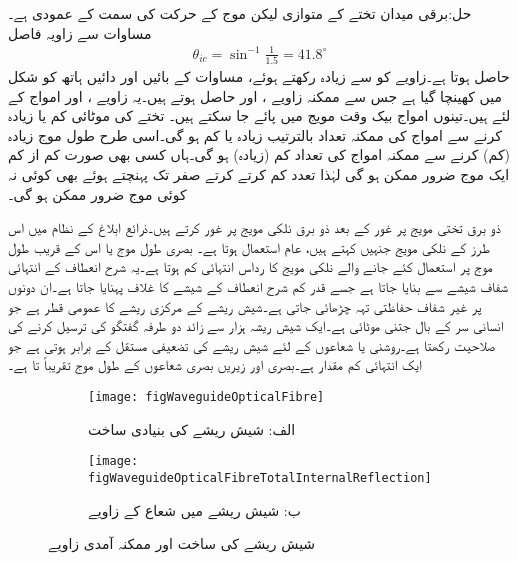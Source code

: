 حل:برقی میدان تختے کے متوازی لیکن موج کے حرکت کی سمت کے عمودی ہے۔مساوات  سے زاویہ فاصل
\begin{align}
\theta_{ic}=\sin^{-1} \frac{1}{1.5}=41.8^{\circ}
\end{align}
حاصل ہوتا ہے۔زاویے کو  سے زیادہ رکھتے  ہوئے، مساوات   کے  بائیں اور دائیں ہاتھ کو شکل  میں کھینچا گیا ہے جس سے ممکنہ زاویے ،  اور  حاصل ہوتے  ہیں۔یہ زاویے ،  اور  امواج کے لئے ہیں۔تینوں امواج بیک وقت مویج میں پائے جا سکتے ہیں۔ تختے کی موٹائی کم یا زیادہ کرنے سے امواج کی ممکنہ تعداد بالترتیب زیادہ یا کم ہو گی۔اسی طرح طول موج زیادہ (کم) کرنے سے ممکنہ امواج کی تعداد کم (زیادہ) ہو گی۔ہاں کسی بھی صورت کم از کم ایک موج ضرور ممکن ہو گی لہٰذا تعدد کم کرتے کرتے صفر تک پہنچتے ہوئے بھی کوئی نہ کوئی موج ضرور ممکن ہو گی۔

ذو برق تختی مویج پر غور کے بعد ذو برق نلکی مویج پر غور کرتے ہیں۔ذرائع ابلاغ کے نظام  میں اس طرز کے نلکی مویج جنہیں  کہتے ہیں،  عام استعمال ہوتا ہے۔ بصری طول موج  یا اس کے قریب طول موج پر استعمال کئے جانے والے نلکی مویج کا رداس انتہائی کم ہوتا ہے۔یہ  شرح  انعطاف کے انتہائی شفاف شیشے سے بنایا جاتا ہے جسے قدر کم  شرح  انعطاف  کے شیشے کا غلاف پہنایا جاتا ہے۔ان دونوں پر غیر شفاف حفاظتی تہہ چڑھائی جاتی ہے۔شیش ریشے کے مرکزی ریشے کا عمومی قطر  ہے جو انسانی سر کے بال جتنی موٹائی ہے۔ایک شیش ریشہ ہزار سے زائد دو طرفہ گفتگو کی ترسیل کرنے کی صلاحیت رکھتا ہے۔روشنی یا  شعاعوں کے لئے شیش ریشے کی تضعیفی مستقل   کے برابر ہوتی ہے جو ایک انتہائی کم مقدار ہے۔بصری اور زیریں بصری شعاعوں کے طول موج تقریباً  تا  ہے۔

\begin{figure}
\centering
\begin{subfigure}{0.45\textwidth}
\centering
\texttt{[image: figWaveguideOpticalFibre]}
\caption*{الف: شیش ریشے کی بنیادی ساخت}
\end{subfigure}%
%
\begin{subfigure}{0.5\textwidth}
\centering
\texttt{[image: figWaveguideOpticalFibreTotalInternalReflection]}
\caption*{ب: شیش ریشے میں شعاع کے  زاویے}
\end{subfigure}%
\caption{شیش ریشے کی ساخت اور ممکنہ آمدی زاویے}
\label{شکل_مویج_شیش_ریشہ}
\end{figure}


